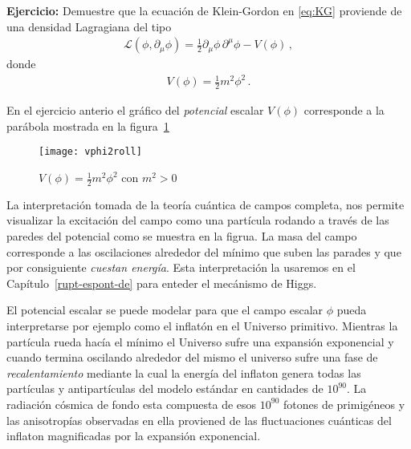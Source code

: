 \textbf{Ejercicio:} Demuestre que la ecuación de Klein-Gordon en \eqref{eq:KG} proviende de una densidad Lagragiana del tipo
\begin{align}
  \mathcal{L}(\phi,\partial_{\mu} \phi)=  \frac{1}{2}{\partial_\mu\phi}\,{\partial^\mu\phi}-V(\phi)\,,
\end{align}
donde
\begin{align}
  V(\phi)=\frac{1}{2}m^2 \phi^2\,.
\end{align}

En el ejercicio anterio el gráfico del \emph{potencial} escalar $V(\phi)$ corresponde a la parábola mostrada en la figura~\ref{fig:x2ini}


\begin{figure} %
  \centering %
  \texttt{[image: vphi2roll]}
  \caption{$V(\phi)=\frac{1}{2}m^2 \phi^2$ con $m^2\gt 0$} %
  \label{fig:x2ini} %
\end{figure} %


La interpretación tomada de la teoría cuántica de campos completa, nos permite visualizar la excitación del campo como una partícula rodando a través de las paredes del potencial como se muestra en la figrua. La masa del campo corresponde a las oscilaciones alrededor del mínimo que suben las parades y que por consiguiente \emph{cuestan energía}. Esta interpretación la usaremos en el Capítulo~\ref{rupt-espont-de} para enteder el mecánismo de Higgs.

El potencial escalar se puede modelar para que el campo escalar $\phi$ pueda interpretarse por ejemplo como el inflatón en el Universo primitivo. Mientras la partícula rueda hacía el mínimo el Universo sufre una expansión exponencial y cuando termina oscilando alrededor del mismo el universo sufre una fase de \emph{recalentamiento} mediante la cual la energía del inflaton genera todas las partículas y antipartículas del modelo estándar en cantidades de $10^{90}$. La radiación cósmica de fondo esta compuesta de esos $10^{90}$ fotones de primigéneos y las anisotropías observadas en ella proviened de las fluctuaciones cuánticas del inflaton magnificadas por la expansión exponencial.

